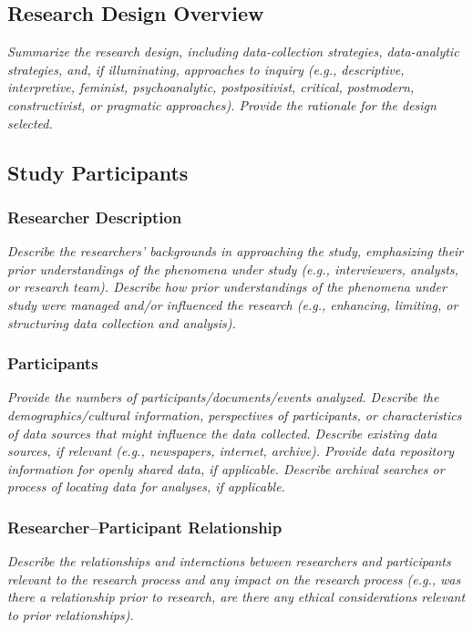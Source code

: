 \documentclass[acmsmall]{acmart}
\begin{document}
\subsection{Research Design Overview}

{\em\small  Summarize the research design, including data-collection strategies, data-analytic strategies, and, if illuminating, approaches to inquiry (e.g., descriptive, interpretive, feminist, psychoanalytic, postpositivist, critical, postmodern, constructivist, or pragmatic approaches). Provide the rationale for the design selected.}

\subsection{Study Participants}

\subsubsection{Researcher Description}

{\em\small Describe the researchers’ backgrounds in approaching the study, emphasizing their prior understandings of the phenomena under study (e.g., interviewers, analysts, or research team). Describe how prior understandings of the phenomena under study were managed and/or influenced the research (e.g., enhancing, limiting, or structuring data collection and analysis).}

\subsubsection{Participants}

{\em\small Provide the numbers of participants/documents/events analyzed. Describe the demographics/cultural information, perspectives of participants, or characteristics of data sources that might influence the data collected. Describe existing data sources, if relevant (e.g., newspapers, internet, archive). Provide data repository information for openly shared data, if applicable. Describe archival searches or process of locating data for analyses, if applicable. }


\subsubsection{Researcher–Participant Relationship}

{\em\small  Describe the relationships and interactions between researchers and participants relevant to the research process and any impact on the research process (e.g., was there a relationship prior to research, are there any ethical considerations relevant to prior relationships). }
\end{document}
